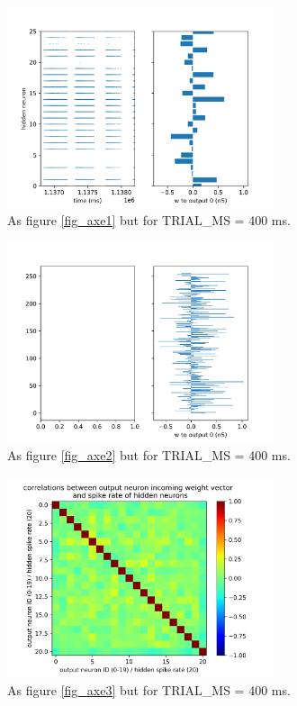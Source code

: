 \documentclass[a4paper]{article}
\begin{document}
  \begin{figure}
    \includegraphics[width=0.7\textwidth]{test_axe2_spikes_weights.png}
    \caption{As figure \ref{fig_axe1} but for TRIAL\_MS =  400 ms. \label{fig_axe4}}
  \end{figure}

  \begin{figure}
    \includegraphics[width=0.7\textwidth]{test_axe1_rates_weights.png}
    \caption{As figure \ref{fig_axe2} but for TRIAL\_MS =  400 ms. \label{fig_axe5}}
  \end{figure}

  \begin{figure}
    \includegraphics[width=0.7\textwidth]{test_axe1_correlations.png}
    \caption{As figure \ref{fig_axe3} but for TRIAL\_MS =  400 ms. \label{fig_axe6}}
  \end{figure}
  
\end{document}
